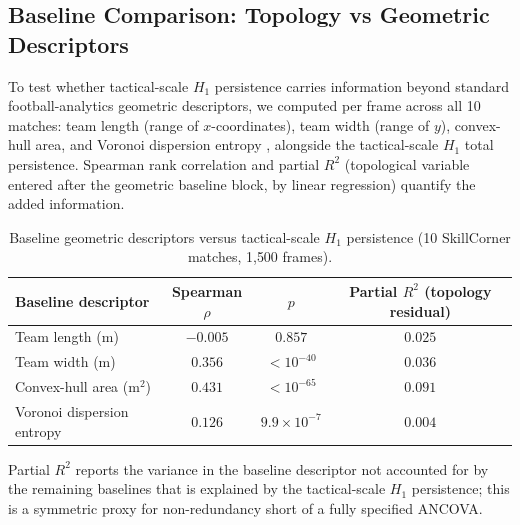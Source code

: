 \subsection{Baseline Comparison: Topology vs Geometric Descriptors}
\label{sec:baseline}

To test whether tactical-scale \(H_1\) persistence carries information beyond standard football-analytics geometric descriptors, we computed per frame across all 10 matches: team length (range of \(x\)-coordinates), team width (range of \(y\)), convex-hull area, and Voronoi dispersion entropy \citep{Folgado2014,FernandezBornn2018}, alongside the tactical-scale \(H_1\) total persistence. Spearman rank correlation and partial \(R^2\) (topological variable entered after the geometric baseline block, by linear regression) quantify the added information.

\begin{table}[H]
  \centering
  \begin{threeparttable}
    \caption{Baseline geometric descriptors versus tactical-scale \(H_1\) persistence (10 SkillCorner matches, 1{,}500 frames).}
    \label{tab:baseline}
    \begin{tabular}{@{}lccc@{}}
      \toprule
      Baseline descriptor & Spearman \(\rho\) & \(p\) & Partial \(R^2\) (topology residual) \\
      \midrule
      Team length (m)                  & \(-0.005\) & \(0.857\) & \(0.025\) \\
      Team width (m)                   & \(0.356\) & \(<10^{-40}\) & \(0.036\) \\
      Convex-hull area (m\(^2\))       & \(0.431\) & \(<10^{-65}\) & \(0.091\) \\
      Voronoi dispersion entropy      & \(0.126\) & \(9.9\times10^{-7}\) & \(0.004\) \\
      \bottomrule
    \end{tabular}
    \begin{tablenotes}
      \small
      \item Partial \(R^2\) reports the variance in the baseline descriptor not accounted for by the remaining baselines that is explained by the tactical-scale \(H_1\) persistence; this is a symmetric proxy for non-redundancy short of a fully specified ANCOVA.
    \end{tablenotes}
  \end{threeparttable}
\end{table}

